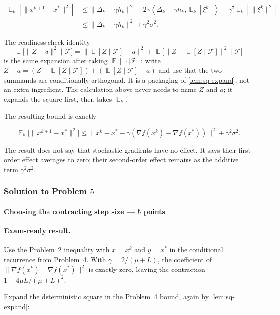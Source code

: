 \documentclass[11pt,a4paper]{article}
\DeclareMathOperator{\E}{\mathbb{E}}
\newcommand{\jump}[2]{\hyperref[#1]{#2}}
\theoremstyle{definition}
\begin{document}
\begin{align*}
\E_k\left[\|x^{k+1}-x^*\|^2\right]
&\leq\|\Delta_k-\gamma h_k\|^2
-2\gamma\left\langle\Delta_k-\gamma h_k,\E_k[\xi^k]\right\rangle
+\gamma^2\E_k\left[\|\xi^k\|^2\right]\\
&\leq\|\Delta_k-\gamma h_k\|^2+\gamma^2\sigma^2.
\end{align*}

The readiness-check identity
\[
\E\bigl[\|Z-a\|^2\mid\mathcal{F}\bigr]
=\bigl\|\E[Z\mid\mathcal{F}]-a\bigr\|^2
+\E\bigl[\|Z-\E[Z\mid\mathcal{F}]\|^2\mid\mathcal{F}\bigr]
\]
is the same expansion after taking $\E[\,\cdot\mid\mathcal{F}]$: write $Z-a=(Z-\E[Z\mid\mathcal{F}])+(\E[Z\mid\mathcal{F}]-a)$ and use that the two summands are conditionally orthogonal. It is a packaging of \cref{lem:sq-expand}, not an extra ingredient. The calculation above never needs to name $Z$ and $a$; it expands the square first, then takes $\E_k$.

The resulting bound is exactly

\[
\E_k\bigl[\|x^{k+1}-x^*\|^2\bigr]
\leq\|x^k-x^* -\gamma(\nabla f(x^k)-\nabla f(x^*))\|^2+\gamma^2\sigma^2.
\]

The result does not say that stochastic gradients have no effect. It says their first-order effect averages to zero; their second-order effect remains as the additive term $\gamma^2\sigma^2$.

\subsubsection{Solution to Problem 5}\label{sol:spr2025-opt-5}

\paragraph{Choosing the contracting step size --- 5 points}

\paragraph{Exam-ready result.}
Use the \jump{prob:spr2025-opt-2}{Problem~2} inequality with $x=x^k$ and $y=x^*$ in the conditional recurrence from \jump{prob:spr2025-opt-4}{Problem~4}. With $\gamma=2/(\mu+L)$, the coefficient of $\|\nabla f(x^k)-\nabla f(x^*)\|^2$ is exactly zero, leaving the contraction $1-4\mu L/(\mu+L)^2$.

Expand the deterministic square in the \jump{prob:spr2025-opt-4}{Problem~4} bound, again by \cref{lem:sq-expand}:
\end{document}
